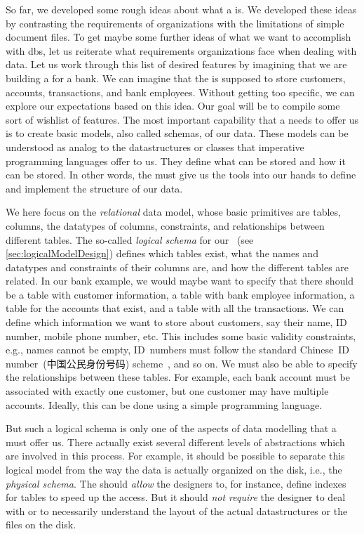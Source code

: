 %
\label{sec:features}%
%
So far, we developed some rough ideas about what a  is.
We developed these ideas by contrasting the requirements of organizations with the limitations of simple document files.
To get maybe some further ideas of what we want to accomplish with \glspl{db}, let us reiterate what requirements organizations face when dealing with data.
Let us work through this list of desired features by imagining that we are building a  for a bank.
We can imagine that the  is supposed to store customers, accounts, transactions, and bank employees.
Without getting too specific, we can explore our expectations based on this idea.
Our goal will be to compile some sort of wishlist of features.%
%
%
The most important capability that a  needs to offer us is to create basic models, also called schemas, of our data.
These models can be understood as analog to the datastructures or classes that imperative programming languages offer to us.
They define what can be stored and how it can be stored.
In other words, the  must give us the tools into our hands to define and implement the structure of our data.

We here focus on the \emph{relational} data model, whose basic primitives are tables, columns, the datatypes of columns, constraints, and relationships between different tables.
The so-called \emph{logical schema} for our ~(see \cref{sec:logicalModelDesign}) defines which tables exist, what the names and datatypes and constraints of their columns are, and how the different tables are related.
In our bank example, we would maybe want to specify that there should be a table with customer information, a table with bank employee information, a table for the accounts that exist, and a table with all the transactions.
We can define which information we want to store about customers, say their name, ID number, mobile phone number, etc.
This includes some basic validity constraints, e.g., names cannot be empty, ID~numbers must follow the standard Chinese~ID number~(中国公民身份号码) scheme~\cite{GB116431999CIN}, and so on.
We must also be able to specify the relationships between these tables.
For example, each bank account must be associated with exactly one customer, but one customer may have multiple accounts.
Ideally, this can be done using a simple programming language.

But such a logical schema is only one of the aspects of data modelling that a  must offer us.
There actually exist several different levels of abstractions which are involved in this process.
For example, it should be possible to separate this logical model from the way the data is actually organized on the disk, i.e., the \emph{physical schema}.
The  should \emph{allow} the  designers to, for instance, define indexes for tables to speed up the access.
But it should \emph{not require} the designer to deal with or to necessarily understand the layout of the actual datastructures or the files on the disk.

